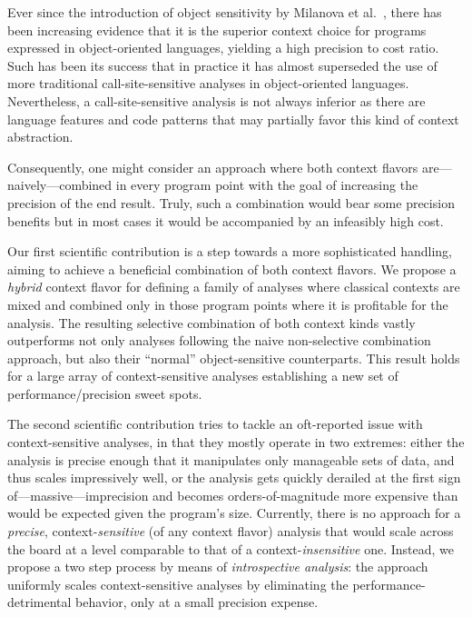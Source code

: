 Ever since the introduction of object sensitivity by Milanova et al.~\cite{issta:2002:Milanova}, there has been increasing evidence that it is the superior context choice for programs expressed in object-oriented languages, yielding a high precision to cost ratio. Such has been its success that in practice it has almost superseded the use of more traditional call-site-sensitive analyses in object-oriented languages. Nevertheless, a call-site-sensitive analysis is not always inferior as there are language features and code patterns that may partially favor this kind of context abstraction.

Consequently, one might consider an approach where both context flavors are---naively---combined in every program point with the goal of increasing the precision of the end result. Truly, such a combination would bear some precision benefits but in most cases it would be accompanied by an infeasibly high cost.

 Our first scientific contribution is a step towards a more sophisticated handling, aiming to achieve a beneficial combination of both context flavors. We propose a \emph{hybrid} context flavor for defining a family of analyses where classical contexts are mixed and combined only in those program points where it is profitable for the analysis. The resulting selective combination of both context kinds vastly outperforms not only analyses following the naive non-selective combination approach, but also their ``normal'' object-sensitive counterparts. This result holds for a large array of context-sensitive analyses establishing a new set of performance/precision sweet spots.

 The second scientific contribution tries to tackle an oft-reported issue with context-sensitive analyses, in that they mostly operate in two extremes: either the analysis is precise enough that it manipulates only manageable sets of data, and thus scales impressively well, or the analysis gets quickly derailed at the first sign of---massive---imprecision and becomes orders-of-magnitude more expensive than would be expected given the program's size. Currently, there is no approach for a \emph{precise}, context-\emph{sensitive} (of any context flavor) analysis that would scale across the board at a level comparable to that of a context-\emph{insensitive} one. Instead, we propose a two step process by means of \emph{introspective analysis}: the approach uniformly scales context-sensitive analyses by eliminating the performance-detrimental behavior, only at a small precision expense.

